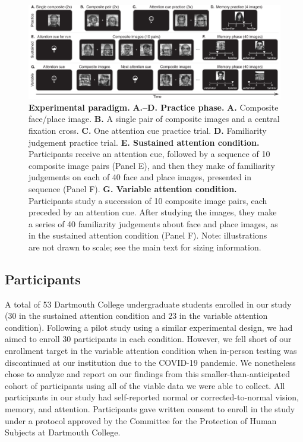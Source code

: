 \documentclass[english]{article}
\begin{document}
\begin{figure}[tp]
  \centering
  \includegraphics[width=1\textwidth]{figs/paradigm}

  \caption{\textbf{Experimental paradigm.} \textbf{A.--D. Practice phase.}
  \textbf{A.} Composite face/place image. \textbf{B.} A single pair of
  composite images and a central fixation cross. \textbf{C.} One attention cue
  practice trial. \textbf{D.} Familiarity judgement practice trial. \textbf{E.
  Sustained attention condition.} Participants receive an attention cue,
  followed by a sequence of 10 composite image pairs (Panel E), and then they
  make of familiarity judgements on each of 40 face and place images, presented
  in sequence (Panel F). \textbf{G. Variable attention condition.} Participants
  study a succession of 10 composite image pairs, each preceded by an attention
  cue. After studying the images, they make a series of 40 familiarity
  judgements about face and place images, as in the sustained attention
  condition (Panel F). Note: illustrations are not drawn to scale; see the main
  text for sizing information.}

\label{fig:paradigm}
\end{figure}

\subsection*{Participants} 

A total of 53 Dartmouth College undergraduate students enrolled in our study
(30 in the sustained attention condition and 23 in the variable attention
condition). Following a pilot study using a similar experimental design, we
had aimed to enroll 30 participants in each condition. However, we fell short of
our enrollment target in the variable attention condition when in-person
testing was discontinued at our institution due to the COVID-19 pandemic. We
nonetheless chose to analyze and report on our findings from this
smaller-than-anticipated cohort of participants using all of the viable data we
were able to collect. All participants in our study had self-reported normal or
corrected-to-normal vision, memory, and attention. Participants gave written
consent to enroll in the study under a protocol approved by the Committee for
the Protection of Human Subjects at Dartmouth College.
\end{document}
